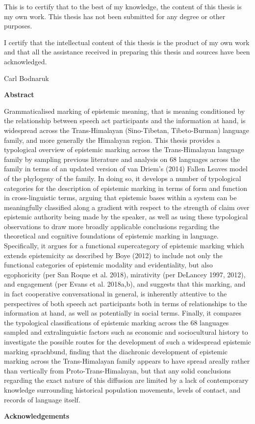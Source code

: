 \begin{center}
This is to certify that to the best of my knowledge, the content of this thesis is my own work. This thesis has not been submitted for any degree or other purposes.

I certify that the intellectual content of this thesis is the product of my own work and that all the assistance received in preparing this thesis and sources have been acknowledged.

\vspace{3cm}
Carl Bodnaruk
\end{center}
\newpage
\begin{center}
    \large
    \textbf{Abstract}
\end{center}
Grammaticalised marking of epistemic meaning, that is meaning conditioned by the relationship between speech act participants and the information at hand, is widespread across the Trans-Himalayan (Sino-Tibetan, Tibeto-Burman) language family, and more generally the Himalayan region. This thesis provides a typological overview of epistemic marking across the Trans-Himalayan language family by sampling previous literature and analysis on 68 languages across the family in terms of an updated version of van Driem's (2014) Fallen Leaves model of the phylogeny of the family. In doing so, it develops a number of typological categories for the description of epistemic marking in terms of form and function in cross-linguistic terms, arguing that epistemic bases within a system can be meaningfully classified along a gradient with respect to the strength of claim over epistemic authority being made by the speaker, as well as using these typological observations to draw more broadly applicable conclusions regarding the theoretical and cognitive foundations of epistemic marking in language. Specifically, it argues for a functional supercategory of epistemic marking which extends epistemicity as described by Boye (2012) to include not only the functional categories of epistemic modality and evidentiality, but also egophoricity (per San Roque et al. 2018), mirativity (per DeLancey 1997, 2012), and engagement (per Evans et al. 2018a,b), and suggests that this marking, and in fact cooperative conversational in general, is inherently attentive to the perspectives of both speech act participants both in terms of relationships to the information at hand, as well as potentially in social terms. Finally, it compares the typological classifications of epistemic marking across the 68 languages sampled and extralinguistic factors such as economic and sociocultural history to investigate the possible routes for the development of such a widespread epistemic marking sprachbund, finding that the diachronic development of epistemic marking across the Trans-Himalayan family appears to have spread areally rather than vertically from Proto-Trans-Himalayan, but that any solid conclusions regarding the exact nature of this diffusion are limited by a lack of contemporary knowledge surrounding historical population movements, levels of contact, and records of language itself.
\newpage
\begin{center}
    \large
    \textbf{Acknowledgements}
\end{center}